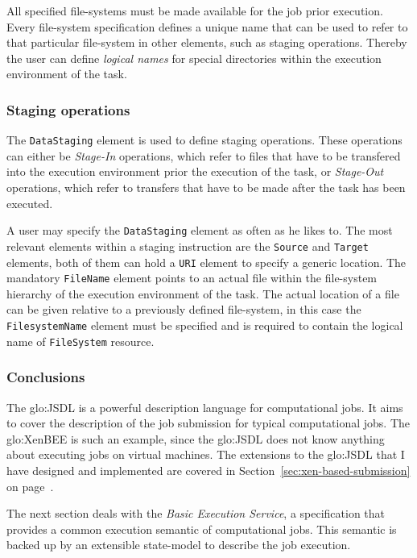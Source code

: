 All  specified file-systems  must  be  made available  for  the job  prior
execution. Every file-system specification  defines a unique name that can
be used to refer to that particular file-system in other elements, such as
staging operations.  Thereby the  user can define \emph{logical names} for
special directories within the execution environment of the task.
  
\subsubsection{Staging operations}

The   \texttt{DataStaging}    element   is   used    to   define   staging
operations.  These operations  can either  be  \emph{Stage-In} operations,
which  refer  to files  that  have to  be  transfered  into the  execution
environment  prior   the  execution  of  the   task,  or  \emph{Stage-Out}
operations, which refer  to transfers that have to be  made after the task
has been executed.

A user may  specify the \texttt{DataStaging} element as  often as he likes
to.   The most  relevant elements  within  a staging  instruction are  the
\texttt{Source}  and \texttt{Target}  elements, both  of them  can  hold a
\texttt{URI}  element  to  specify  a  generic  location.   The  mandatory
\texttt{FileName} element points to  an actual file within the file-system
hierarchy of the execution environment of the task. The actual location of
a file can be given relative  to a previously defined file-system, in this
case the \texttt{FilesystemName} element must be specified and is required
to contain the logical name of \texttt{FileSystem} resource.

\subsubsection{Conclusions}

The \gls{glo:JSDL}  is a  powerful description language  for computational
jobs. It aims  to cover the description of the  job submission for typical
computational  jobs. The \gls{glo:XenBEE}  is such  an example,  since the
\gls{glo:JSDL}  does not  know anything  about executing  jobs  on virtual
machines.  The extensions  to the \gls{glo:JSDL} that I  have designed and
implemented  are   covered  in  Section~\ref{sec:xen-based-submission}  on
page~\pageref{sec:xen-based-submission}.

The  next  section  deals  with  the  \emph{Basic  Execution  Service},  a
specification that  provides a common execution  semantic of computational
jobs. This semantic is backed  up by an extensible state-model to describe
the job execution.

